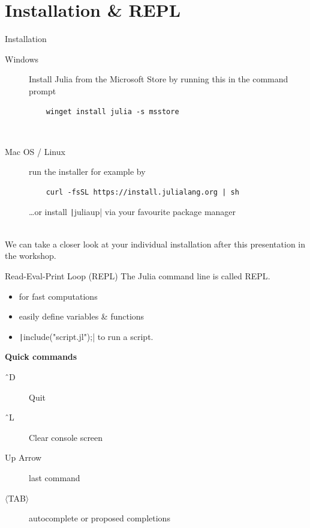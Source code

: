 \documentclass[aspectratio=169, 11pt, handout]{beamer}
\begin{document}
    \section{Installation \& REPL}
    \begin{frame}[fragile]{Installation}
        \begin{description}
            \item[Windows] Install Julia from the Microsoft Store by running this in the command prompt
            \begin{verbatim}
    winget install julia -s msstore
            \end{verbatim}
            \ \\[2\baselineskip]
            \item[Mac OS / Linux] run the installer for example by
            \begin{verbatim}
    curl -fsSL https://install.julialang.org | sh
            \end{verbatim}
            \ldots or install \texttt|juliaup| via your favourite package manager
        \end{description}
        \ \\
        We can take a closer look at your individual installation after this presentation in the workshop.
    \end{frame}
    \begin{frame}{Read-Eval-Print Loop (REPL)}
        The Julia command line is called \alert{REPL}.
        \begin{itemize}
            \item for fast computations
            \item easily define variables \& functions
            \item \texttt|include("script.jl");| to run a script.
        \end{itemize}
        \vspace{\baselineskip}
        \pause
        \alert{\textbf{Quick commands}}
        \begin{description}
            \item[\^\ D] Quit
            \item[\^\ L] Clear console screen
            \item[Up Arrow] last command
            \item[{$\langle$TAB$\rangle$}] autocomplete or proposed completions
        \end{description}
    \end{frame}
\end{document}
